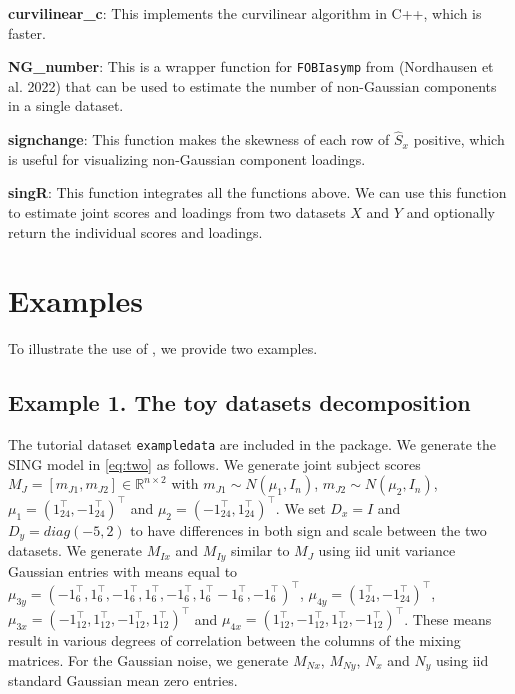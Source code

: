 \textbf{curvilinear\_c}: This implements the curvilinear algorithm in C++, which is faster.

\textbf{NG\_number}: This is a wrapper function for \texttt{FOBIasymp} from  (Nordhausen et al. 2022) that can be used to estimate the number of non-Gaussian components in a single dataset.

\textbf{signchange}: This function makes the skewness of each row of \(\widehat{S}_{x}\) positive, which is useful for visualizing non-Gaussian component loadings.

\textbf{singR}: This function integrates all the functions above. We can use this function to estimate joint scores and loadings from two datasets \(X\) and \(Y\) and optionally return the individual scores and loadings.

\hypertarget{examples}{%
\section{Examples}\label{examples}}

To illustrate the use of , we provide two examples.

\hypertarget{example-1.-the-toy-datasets-decomposition}{%
\subsection{Example 1. The toy datasets decomposition}\label{example-1.-the-toy-datasets-decomposition}}

The tutorial dataset \texttt{exampledata} are included in the  package. We generate the SING model in \eqref{eq:two} as follows. We generate joint subject scores \(M_{J}=[m_{J1},m_{J2}]\in \mathbb{R}^{n\times2}\) with \(m_{J1}\sim N(\mu_{1},I_{n})\), \(m_{J2}\sim N(\mu_{2},I_{n})\), \(\mu_{1}=(1_{24}^{\top},-1_{24}^{\top})^{\top}\) and \(\mu_{2}=(-1_{24}^{\top},1_{24}^{\top})^{\top}\). We set \(D_{x}=I\) and \(D_{y}=diag(-5,2)\) to have differences in both sign and scale between the two datasets. We generate \(M_{Ix}\) and \(M_{Iy}\) similar to \(M_{J}\) using iid unit variance Gaussian entries with means equal to \(\mu_{3y}=(-1_{6}^{\top},1_{6}^{\top},-1_{6}^{\top},1_{6}^{\top},-1_{6}^{\top},1_{6}^{\top}-1_{6}^{\top},-1_{6}^{\top})^{\top}\), \(\mu_{4y}=(1_{24}^{\top},-1_{24}^{\top})^{\top}\), \(\mu_{3x}=(-1_{12}^{\top},1_{12}^{\top},-1_{12}^{\top},1_{12}^{\top})^{\top}\) and \(\mu_{4x}=(1_{12}^{\top},-1_{12}^{\top},1_{12}^{\top},-1_{12}^{\top})^{\top}\). These means result in various degrees of correlation between the columns of the mixing matrices. For the Gaussian noise, we generate \(M_{Nx}\), \(M_{Ny}\), \(N_{x}\) and \(N_{y}\) using iid standard Gaussian mean zero entries.

